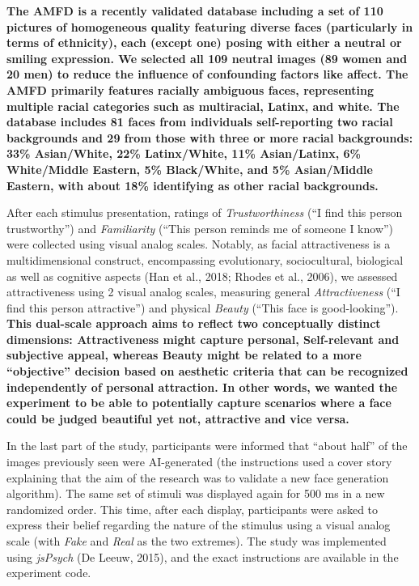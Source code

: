 \documentclass[
  man,
  floatsintext,
  longtable,
  nolmodern,
  notxfonts,
  notimes,
  colorlinks=true,linkcolor=blue,citecolor=blue,urlcolor=blue]{apa7}
\begin{document}
\textbf{The AMFD is a recently validated database including a set of 110
pictures of homogeneous quality featuring diverse faces (particularly in
terms of ethnicity), each (except one) posing with either a neutral or
smiling expression. We selected all 109 neutral images (89 women and 20
men) to reduce the influence of confounding factors like affect. The
AMFD primarily features racially ambiguous faces, representing multiple
racial categories such as multiracial, Latinx, and white. The database
includes 81 faces from individuals self-reporting two racial backgrounds
and 29 from those with three or more racial backgrounds: 33\%
Asian/White, 22\% Latinx/White, 11\% Asian/Latinx, 6\% White/Middle
Eastern, 5\% Black/White, and 5\% Asian/Middle Eastern, with about 18\%
identifying as other racial backgrounds.}

After each stimulus presentation, ratings of \emph{Trustworthiness} (``I
find this person trustworthy'') and \emph{Familiarity} (``This person
reminds me of someone I know'') were collected using visual analog
scales. Notably, as facial attractiveness is a multidimensional
construct, encompassing evolutionary, sociocultural, biological as well
as cognitive aspects (Han et al., 2018; Rhodes et al., 2006), we
assessed attractiveness using 2 visual analog scales, measuring general
\emph{Attractiveness} (``I find this person attractive'') and physical
\emph{Beauty} (``This face is good-looking''). \textbf{This dual-scale
approach aims to reflect two conceptually distinct dimensions:
Attractiveness might capture personal, Self-relevant and subjective
appeal, whereas Beauty might be related to a more ``objective'' decision
based on aesthetic criteria that can be recognized independently of
personal attraction. In other words, we wanted the experiment to be able
to potentially capture scenarios where a face could be judged beautiful
yet not, attractive and vice versa.}

In the last part of the study, participants were informed that ``about
half'' of the images previously seen were AI-generated (the instructions
used a cover story explaining that the aim of the research was to
validate a new face generation algorithm). The same set of stimuli was
displayed again for 500 ms in a new randomized order. This time, after
each display, participants were asked to express their belief regarding
the nature of the stimulus using a visual analog scale (with \emph{Fake}
and \emph{Real} as the two extremes). The study was implemented using
\emph{jsPsych} (De Leeuw, 2015), and the exact instructions are
available in the experiment code.
\end{document}
